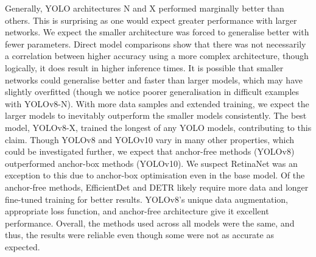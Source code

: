 Generally, YOLO architectures N and X performed marginally better than others. This is surprising as one would expect greater performance with larger networks. We expect the smaller architecture was forced to generalise better with fewer parameters. Direct model comparisons show that there was not necessarily a correlation between higher accuracy using a more complex architecture, though logically, it does result in higher inference times. It is possible that smaller networks could generalise better and faster than larger models, which may have slightly overfitted (though we notice poorer generalisation in difficult examples with YOLOv8-N). With more data samples and extended training, we expect the larger models to inevitably outperform the smaller models consistently. The best model, YOLOv8-X, trained the longest of any YOLO models, contributing to this claim. Though YOLOv8 and YOLOv10 vary in many other properties, which could be investigated further, we expect that anchor-free methods (YOLOv8) outperformed anchor-box methods (YOLOv10). We suspect RetinaNet was an exception to this due to anchor-box optimisation even in the base model. Of the anchor-free methods, EfficientDet and DETR likely require more data and longer fine-tuned training for better results. YOLOv8's unique data augmentation, appropriate loss function, and anchor-free architecture give it excellent performance. Overall, the methods used across all models were the same, and thus, the results were reliable even though some were not as accurate as expected. 

